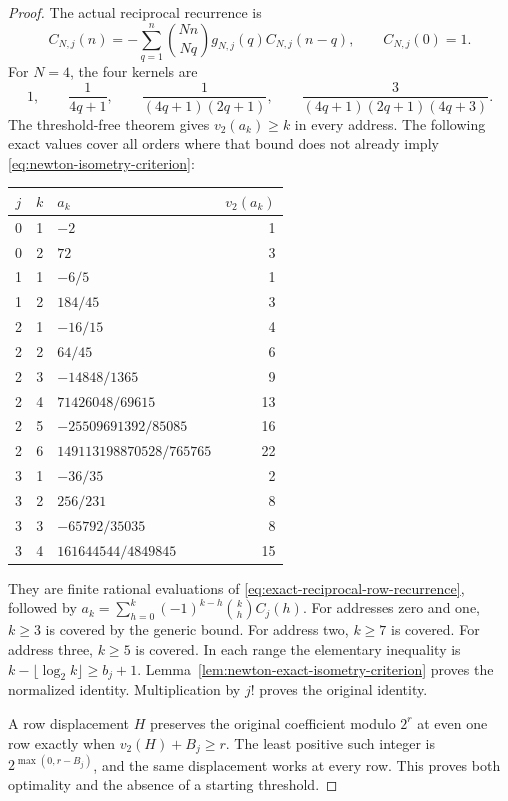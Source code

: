 \begin{proof}
The actual reciprocal recurrence is
\begin{equation}
 C_{N,j}(n)=-\sum_{q=1}^n\binom{Nn}{Nq}
           g_{N,j}(q)C_{N,j}(n-q),\qquad C_{N,j}(0)=1.
 \label{eq:exact-reciprocal-row-recurrence}
\end{equation}
For $N=4$, the four kernels are
\[
 1,\qquad\frac1{4q+1},\qquad
 \frac1{(4q+1)(2q+1)},\qquad
 \frac3{(4q+1)(2q+1)(4q+3)}.
\]
The threshold-free theorem gives $v_2(a_k)\geq k$ in every address.
The following exact values cover all orders where that bound does not
already imply \eqref{eq:newton-isometry-criterion}:
\begin{center}
\begin{tabular}{c r l r}
$j$&$k$&$a_k$&$v_2(a_k)$\\\hline
0&1&$-2$&1\\
0&2&$72$&3\\
1&1&$-6/5$&1\\
1&2&$184/45$&3\\
2&1&$-16/15$&4\\
2&2&$64/45$&6\\
2&3&$-14848/1365$&9\\
2&4&$71426048/69615$&13\\
2&5&$-25509691392/85085$&16\\
2&6&$149113198870528/765765$&22\\
3&1&$-36/35$&2\\
3&2&$256/231$&8\\
3&3&$-65792/35035$&8\\
3&4&$161644544/4849845$&15
\end{tabular}
\end{center}
They are finite rational evaluations of
\eqref{eq:exact-reciprocal-row-recurrence}, followed by
$a_k=\sum_{h=0}^k(-1)^{k-h}\binom kh C_j(h)$.
For addresses zero and one, $k\geq3$ is covered by the generic bound.
For address two, $k\geq7$ is covered. For address three, $k\geq5$ is
covered. In each range the elementary inequality is
$k-\lfloor\log_2k\rfloor\geq b_j+1$.
Lemma~\ref{lem:newton-exact-isometry-criterion} proves the normalized
identity. Multiplication by $j!$ proves the original identity.

A row displacement $H$ preserves the original coefficient modulo
$2^r$ at even one row exactly when $v_2(H)+B_j\geq r$.
The least positive such integer is
$2^{\max(0,r-B_j)}$, and the same displacement works at every row.
This proves both optimality and the absence of a starting threshold.
\end{proof}


